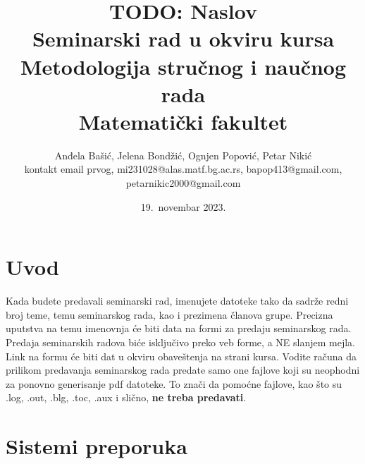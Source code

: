 \documentclass[a4paper]{article}
\begin{document}
\title{TODO: Naslov\\ \small{Seminarski rad u okviru kursa\\Metodologija stručnog i naučnog rada\\ Matematički fakultet}}

\author{Anđela Bašić, Jelena Bondžić, Ognjen Popović, Petar Nikić\\ \small{kontakt email prvog, mi231028@alas.matf.bg.ac.rs, bapop413@gmail.com, petarnikic2000@gmail.com}}

\date{19.~novembar 2023.}

\maketitle


\tableofcontents

\newpage

\section{Uvod}
\label{sec:uvod}

Kada budete predavali seminarski rad, imenujete datoteke tako da sadrže redni broj teme, temu seminarskog rada, kao i prezimena članova grupe. Precizna uputstva na temu imenovnja će biti data na formi za predaju seminarskog rada. Predaja seminarskih radova biće isključivo preko veb forme, a NE slanjem mejla. Link na formu će biti dat u okviru obaveštenja na strani kursa. Vodite računa da prilikom predavanja seminarskog rada predate samo one fajlove koji su neophodni za ponovno generisanje pdf datoteke. To znači da pomoćne fajlove, kao što su .log, .out, .blg, .toc, .aux i slično, \textbf{ne treba predavati}.

\section{Sistemi preporuka}
\label{sec:sistemi_preporuka}
\end{document}
